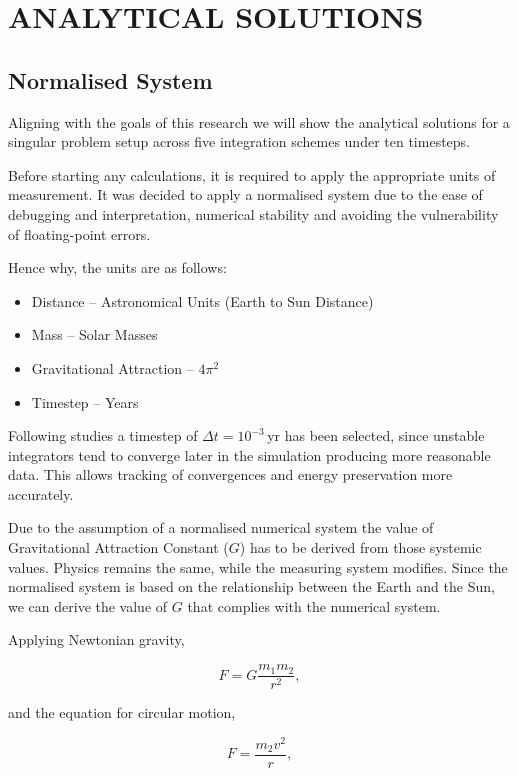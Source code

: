 \section{ANALYTICAL SOLUTIONS}
\subsection{Normalised System}

Aligning with the goals of this research we will show the analytical solutions for a singular problem setup across
five integration schemes under ten timesteps.

Before starting any calculations, it is required to apply the appropriate units of measurement.
It was decided to apply a normalised system due to the ease of debugging and interpretation, numerical stability
and avoiding the vulnerability of floating-point errors.

Hence why, the units are as follows:
\begin{itemize}
    \item Distance -- Astronomical Units (Earth to Sun Distance)
    \item Mass -- Solar Masses
    \item Gravitational Attraction -- $4\pi^2$
    \item Timestep -- Years
\end{itemize}
Following studies a timestep of $\Delta t = 10^{-3}$\,yr has been selected, since unstable integrators tend to
converge later in the simulation producing more reasonable data.
This allows tracking of convergences and energy preservation more accurately.

Due to the assumption of a normalised numerical system the value of Gravitational Attraction Constant ($G$) has to be
derived from those systemic values.
Physics remains the same, while the measuring system modifies.
Since the normalised system is based on the relationship between the Earth and the Sun, we can derive the value of $G$
that complies with the numerical system.

Applying Newtonian gravity,

\begin{equation}
    F = G\frac{m_1 m_2}{r^2},
\end{equation}

and the equation for circular motion,

\begin{equation}
    F = \frac{m_2 v^2}{r},
\end{equation}

